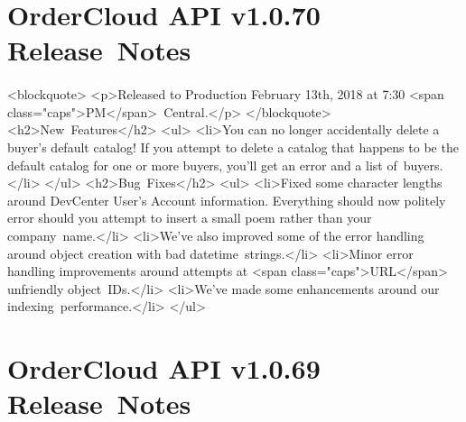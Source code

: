 \documentclass{memoir}%
\begin{document}
%
\section*{OrderCloud API v1.0.70 Release~Notes}%
\paragraph*{}%

%
\paragraph*{}%
<blockquote>\newline%
<p>Released to Production February 13th, 2018 at 7:30 <span class="caps">PM</span>~Central.</p>\newline%
</blockquote>\newline%
<h2>New~Features</h2>\newline%
<ul>\newline%
<li>You can no longer accidentally delete a buyer’s default catalog! If you attempt to delete a catalog that happens to be the default catalog for one or more buyers, you’ll get an error and a list of~buyers.</li>\newline%
</ul>\newline%
<h2>Bug~Fixes</h2>\newline%
<ul>\newline%
<li>Fixed some character lengths around DevCenter User’s Account information. Everything should now politely error should you attempt to insert a small poem rather than your company~name.</li>\newline%
<li>We’ve also improved some of the error handling around object creation with bad datetime~strings.</li>\newline%
<li>Minor error handling improvements around attempts at <span class="caps">URL</span> unfriendly object~IDs.</li>\newline%
<li>We’ve made some enhancements around our indexing~performance.</li>\newline%
</ul>

%
\section*{OrderCloud API v1.0.69 Release~Notes}%
\paragraph*{}%

%
\end{document}
